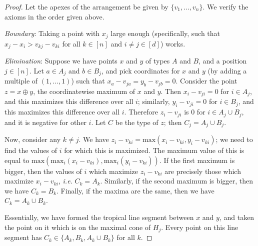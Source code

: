 \documentclass[11pt]{amsart}
\begin{document}
\begin{proof}
Let the apexes of the arrangement be given by $\{v_1, \ldots, v_n\}$. We verify the axioms in the order given above.

\textit{Boundary}: Taking a point with $x_j$ large enough (specifically, such that $x_j-x_i > v_{kj} - v_{ki}$ for 
all $k\in [n]$ and $i\neq j\in [d]$) works.

\textit{Elimination}: Suppose we have points $x$ and $y$ of types $A$ and $B$, and a position $j\in [n]$. %
Let $a \in A_j$ and $b \in B_j$, and pick coordinates for $x$ and $y$ (by adding a multiple of $(1, 
\ldots, 1)$) such that $x_a - v_{ja} = y_b - v_{jb} = 0$. Consider the point $z = x\oplus y$, the coordinatewise maximum of $x$ and $y$. 
Then $x_i - v_{ji} = 0$ for $i\in A_j$, and this maximizes this difference over all $i$; similarly, $y_i - v_{ji} = 0$ for $i\in B_j$, and 
this maximizes this difference over all $i$. Therefore $z_i - v_{ji}$ is $0$ for $i\in A_j \cup B_j$, and it is negative for other $i$. Let $C$ be the type of $z$; then $C_j = A_j\cup B_j$. 

Now, consider any $k\neq j$. We have $z_i - v_{ki} = \text{max} (x_i - v_{ki}, y_i - v_{ki})$; we need to find the values of $i$ for which this is maximized. 
The maximum value of this is equal to $\text{max} (\text{max}_i (x_i - v_{ki}), \text{max}_i (y_i - v_{ki}))$. If the first maximum is bigger, then 
the values of $i$ which maximize $z_i - v_{ki}$ are precisely those which maximize $x_i - v_{ki}$, \emph{i.e.} $C_k = A_k$. Similarly, if the second maximum is 
bigger, then we have $C_k = B_k$. Finally, if the maxima are the same, then we have $C_k = A_k\cup B_k$. 

Essentially, we have formed the tropical 
line segment between $x$ and $y$, and taken the point on it which is on the maximal cone of $H_j$. Every 
point on this line segment has $C_k\in \{A_k, B_k, A_k\cup B_k\}$ for all $k$.


\end{proof}
\end{document}
